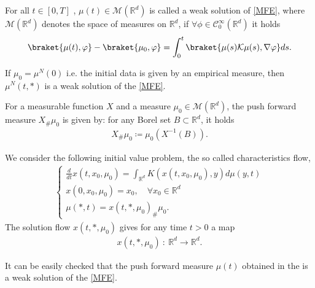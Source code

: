 \begin{definition}\label{weak_solution_of_mfe}
  For all $t \in [0,T]$ , $\mu (t) \in  \mathcal{M}(\mathbb{R}^{d} )$ is called a 
  weak solution of \autoref{MFE}, where $\mathcal{M}(\mathbb{R}^{d} )$ denotes the space of measures on $\mathbb{R}^{d}$, if $\forall  \phi  \in  \mathcal{C}_0^{\infty}(\mathbb{R}^{d} ) $ it holds 
  \begin{align*}
    \braket{\mu(t),\phi } - \braket{\mu_0,\phi } = \int_0^{t} \braket{\mu (s)\mathcal{K}\mu(s),\nabla \phi } ds
  .\end{align*}
\end{definition}
\begin{remark}
 If $\mu_0 =  \mu ^{N}(0) $  i.e. the initial data is given by an empirical measure, then 
 $\mu ^{N}(t,*) $ is a weak solution of the \autoref{MFE}.
\end{remark}

\begin{definition}
 For a measurable function $X$ and a measure $\mu_0 \in  \mathcal{M}(\mathbb{R}^{d} )$, the push forward measure $X_\# \mu_0$ is given by: for any Borel set $B \subset \mathbb{R}^{d} $, it holds
 \begin{align*}
  X_\# \mu_0  \coloneqq  \mu_0(X^{-1}(B) ) 
 .\end{align*}
\end{definition}
We consider the following initial value problem, the so called characteristics flow,
 \begin{align}\label{characteristics_equation}
    \begin{cases}
  \displaystyle\frac{d}{dt} x(t,x_{0},\mu_0) = \int_{\mathbb{R}^{d} } K(x(t,x_{0},\mu_0),y)d\mu(y,t)\\
      x(0,x_{0},\mu_{0} )=x_{0}, \quad \forall  x_{0} \in  \mathbb{R}^{d} \\ 
     \mu(*,t) = x(t,*,\mu_0)_\# \mu_0.
    \end{cases}
  \end{align}
The solution flow $x(t,*,\mu_0)$ gives for any time $t>0$ a map 
  \begin{align*}
    x(t,*,\mu_0) \ : \ \mathbb{R}^{d} \to  \mathbb{R}^{d} 
  .\end{align*}

\begin{remark}
  It can be easily checked that the push forward measure $\mu(t)$ obtained in the  is a 
 weak solution of the \autoref{MFE}.
\end{remark}
\vskip5mm


